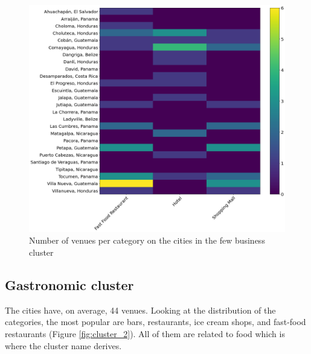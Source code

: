 \documentclass[letterpaper,12pt]{article}
\begin{document}
\begin{figure}[h]
    \centering
    \includegraphics[width=\textwidth]{images/cluster1.png}
    \caption{Number of venues per category on the cities in the few business cluster}
    \label{fig:cluster_1}
\end{figure}

\subsection{Gastronomic cluster}

The cities have, on average, 44 venues. Looking at the distribution of the categories, the most popular are bars,  restaurants, ice cream shops, and fast-food restaurants (Figure \ref{fig:cluster_2}). All of them are related to food which is where the cluster name derives. 
\end{document}
